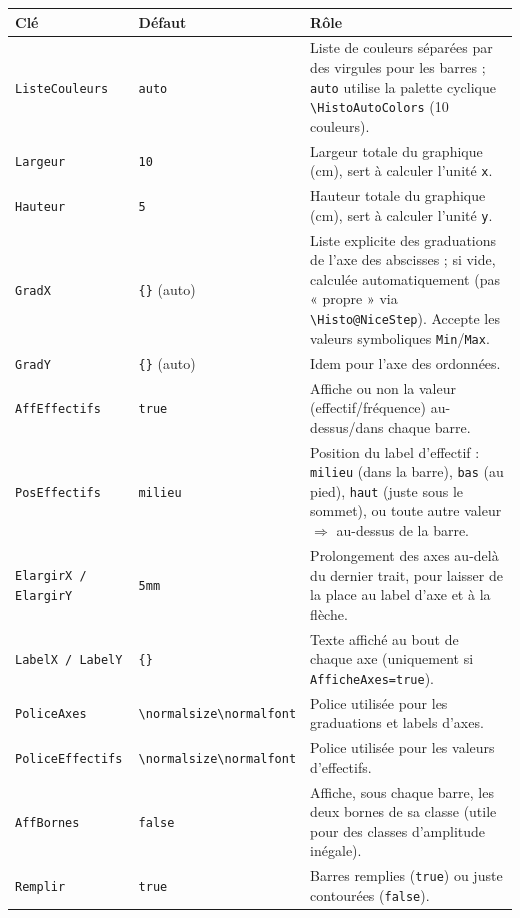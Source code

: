 \documentclass[11pt,a4paper]{article}
\begin{document}
\begin{longtable}{@{}p{3.6cm}p{3cm}p{7cm}@{}}
\toprule
\textbf{Clé} & \textbf{Défaut} & \textbf{Rôle} \\
\midrule
\endhead
\texttt{ListeCouleurs} & \texttt{auto} & Liste de couleurs séparées par des virgules pour les barres ; \texttt{auto} utilise la palette cyclique \texttt{\textbackslash HistoAutoColors} (10 couleurs). \\[3pt]
\texttt{Largeur} & \texttt{10} & Largeur totale du graphique (cm), sert à calculer l'unité \texttt{x}. \\[3pt]
\texttt{Hauteur} & \texttt{5} & Hauteur totale du graphique (cm), sert à calculer l'unité \texttt{y}. \\[3pt]
\texttt{GradX} & \texttt{\{\}} (auto) & Liste explicite des graduations de l'axe des abscisses ; si vide, calculée automatiquement (pas « propre » via \texttt{\textbackslash Histo@NiceStep}). Accepte les valeurs symboliques \texttt{Min}/\texttt{Max}. \\[3pt]
\texttt{GradY} & \texttt{\{\}} (auto) & Idem pour l'axe des ordonnées. \\[3pt]
\texttt{AffEffectifs} & \texttt{true} & Affiche ou non la valeur (effectif/fréquence) au-dessus/dans chaque barre. \\[3pt]
\texttt{PosEffectifs} & \texttt{milieu} & Position du label d'effectif : \texttt{milieu} (dans la barre), \texttt{bas} (au pied), \texttt{haut} (juste sous le sommet), ou toute autre valeur $\Rightarrow$ au-dessus de la barre. \\[3pt]
\texttt{ElargirX / ElargirY} & \texttt{5mm} & Prolongement des axes au-delà du dernier trait, pour laisser de la place au label d'axe et à la flèche. \\[3pt]
\texttt{LabelX / LabelY} & \texttt{\{\}} & Texte affiché au bout de chaque axe (uniquement si \texttt{AfficheAxes=true}). \\[3pt]
\texttt{PoliceAxes} & \texttt{\textbackslash normalsize\textbackslash normalfont} & Police utilisée pour les graduations et labels d'axes. \\[3pt]
\texttt{PoliceEffectifs} & \texttt{\textbackslash normalsize\textbackslash normalfont} & Police utilisée pour les valeurs d'effectifs. \\[3pt]
\texttt{AffBornes} & \texttt{false} & Affiche, sous chaque barre, les deux bornes de sa classe (utile pour des classes d'amplitude inégale). \\[3pt]
\texttt{Remplir} & \texttt{true} & Barres remplies (\texttt{true}) ou juste contourées (\texttt{false}). \\[3pt]

\end{longtable}
\end{document}
